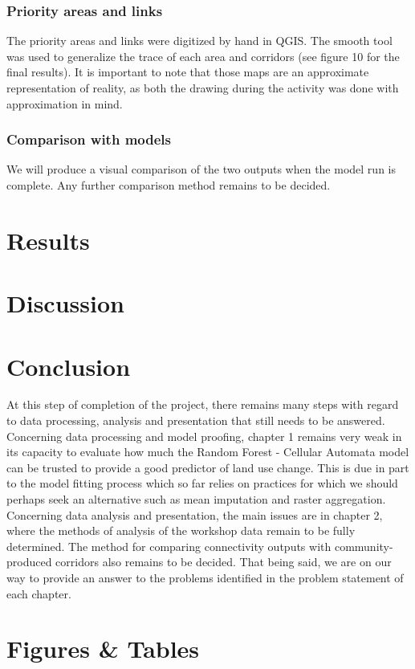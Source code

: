 \subsubsection*{Priority areas and links}

The priority areas and links were digitized by hand in QGIS. The smooth tool was used to generalize the trace of each area and corridors (see figure 10 for the final results). It is important to note that those maps  are an approximate representation of reality, as both the drawing during the activity was done with approximation in mind.

\subsubsection{Comparison with models}

We will produce a visual comparison of the two outputs when the model run is complete. Any further comparison method remains to be decided.

\section{Results}

\section{Discussion}

\section{Conclusion}

At this step of completion of the project, there remains many steps with regard to data processing, analysis and presentation that still needs to be answered. Concerning data processing and model proofing, chapter 1 remains very weak in its capacity to evaluate how much the Random Forest - Cellular Automata model can be trusted to provide a good predictor of land use change. This is due in part to the model fitting process which so far relies on practices for which we should perhaps seek an alternative such as mean imputation and raster aggregation. Concerning data analysis and presentation, the main issues are in chapter 2, where the methods of analysis of the workshop data remain to be fully determined. The method for comparing  connectivity outputs with community-produced corridors also remains to be decided. That being said, we are on our way to provide an answer to the problems identified in the problem statement of each chapter.

\newpage
\section*{Figures \& Tables}
